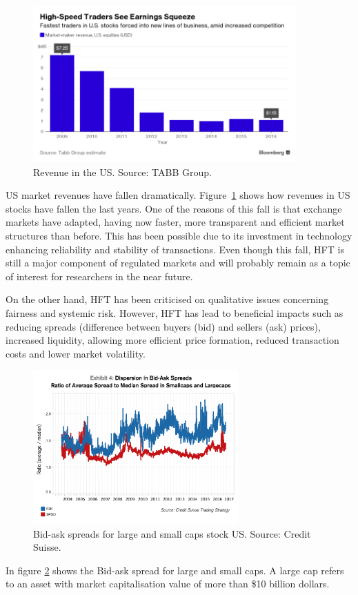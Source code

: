 \begin{figure}[!h]
  \centering
  \includegraphics[width=0.9\textwidth]{img/HFTmarket2.png}
  \caption[Revenue in the US]{Revenue in the US. Source: TABB Group.}
  \label{fig:HFTmarket2}
\end{figure}
US market revenues have fallen dramatically. Figure~\ref{fig:HFTmarket2} shows how revenues in US stocks have fallen the last years. One of the reasons of this fall is that exchange markets have adapted, having
now faster, more transparent and efficient market structures than before.
This has been possible due to its investment in technology enhancing
reliability and stability of transactions. Even though this fall, HFT is still a major component of regulated markets and
will probably remain as a topic of interest for researchers in the near future.

On the other hand, HFT has been criticised on qualitative issues concerning
fairness and systemic risk. However, HFT has lead to
beneficial impacts such as reducing spreads (difference between buyers (bid) and
sellers (ask) prices), increased liquidity, allowing more efficient price formation,
reduced transaction costs and lower market volatility. 

\begin{figure}[!ht]
  \centering
  \includegraphics[width=0.7\textwidth]{img/bid-ask-spreads.jpg}
  \caption[Bid-ask spreads]{Bid-ask spreads for large and small caps stock US. Source: Credit Suisse.}
  \label{fig:Spreads}
\end{figure}
In figure \ref{fig:Spreads}  shows the Bid-ask spread for large and small caps. A large cap refers to an asset with market capitalisation value of more than \$10 billion dollars.

